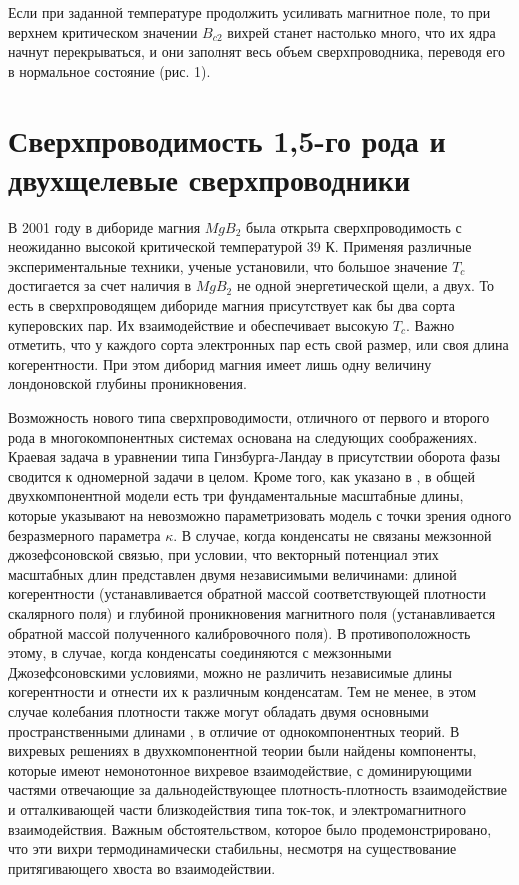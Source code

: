 Если при заданной температуре продолжить усиливать магнитное поле, то при 
верхнем критическом значении \( B_{c2} \) вихрей станет настолько много, что 
их ядра начнут перекрываться, и они заполнят весь объем сверхпроводника, 
переводя его в нормальное состояние (рис. 1).\cite{bib:net}

\section{Сверхпроводимость 1,5-го рода и двухщелевые сверхпроводники}
В 2001 году в дибориде магния \( MgB_2 \) была открыта сверхпроводимость с 
неожиданно высокой критической температурой 39 К. Применяя различные 
экспериментальные техники, ученые установили, что большое значение \( T_c \) 
достигается за счет наличия в \( MgB_2 \) не одной энергетической щели, а 
двух. То есть в сверхпроводящем дибориде магния присутствует как бы два сорта 
куперовских пар. Их взаимодействие и обеспечивает высокую \( T_c \). Важно 
отметить, что у каждого сорта электронных пар есть свой размер, или своя длина 
когерентности. При этом диборид магния имеет лишь одну величину лондоновской 
глубины проникновения.

Возможность нового типа сверхпроводимости, отличного от первого и второго рода 
в многокомпонентных системах \cite{bib:1,bib:2} основана на следующих 
соображениях. Краевая задача в уравнении типа Гинзбурга-Ландау в присутствии 
оборота фазы сводится к одномерной задачи в целом. Кроме того, как указано в 
\cite{bib:1,bib:2}, в общей двухкомпонентной модели есть три фундаментальные 
масштабные длины, которые указывают на невозможно параметризовать модель с 
точки зрения одного безразмерного параметра \( \kappa \). В случае, когда 
конденсаты не связаны межзонной джозефсоновской связью, при условии, что 
векторный потенциал этих масштабных длин представлен двумя независимыми 
величинами: длиной когерентности (устанавливается обратной массой 
соответствующей плотности скалярного поля) и глубиной проникновения магнитного 
поля (устанавливается обратной массой полученного калибровочного поля). В 
противоположность этому, в случае, когда конденсаты соединяются с межзонными 
Джозефсоновскими условиями, можно не различить независимые длины когерентности 
и отнести их к различным конденсатам. Тем не менее, в этом случае колебания 
плотности также могут обладать двумя основными пространственными длинами
\cite{bib:2}, в отличие от однокомпонентных теорий. В \cite{bib:1,bib:2} 
вихревых решениях в двухкомпонентной теории были найдены компоненты, которые 
имеют немонотонное вихревое взаимодействие, с доминирующими частями отвечающие 
за дальнодействующее плотность-плотность взаимодействие и отталкивающей части 
близкодействия типа ток-ток, и электромагнитного взаимодействия. Важным 
обстоятельством, которое было продемонстрировано, что эти вихри 
термодинамически стабильны, несмотря на существование притягивающего хвоста во 
взаимодействии.

